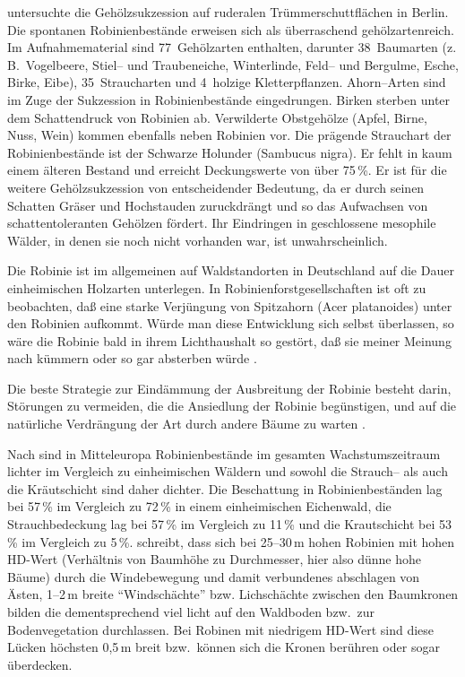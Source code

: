 \documentclass[twocolumn]{scrartcl}
\begin{document}
\citet{kowarik1990robinie} untersuchte die Gehölzsukzession auf
ruderalen Trümmerschuttflächen in Berlin. Die spontanen
Robinienbestände erweisen sich als überraschend gehölzartenreich. Im
Aufnahmematerial sind 77~Gehölzarten enthalten, darunter 38~Baumarten
(z.\,B.\ Vogelbeere, Stiel-- und Traubeneiche, Winterlinde, Feld-- und
Bergulme, Esche, Birke, Eibe), 35~Straucharten und 4~holzige
Kletterpflanzen. Ahorn--Arten sind im Zuge der Sukzession in
Robinienbestände eingedrungen. Birken sterben unter dem Schattendruck
von Robinien ab. Verwilderte Obstgehölze (Apfel, Birne, Nuss, Wein)
kommen ebenfalls neben Robinien vor. Die prägende Strauchart der
Robinienbestände ist der Schwarze Holunder (Sambucus nigra). Er fehlt
in kaum einem älteren Bestand und erreicht Deckungswerte von über
75\,\%. Er ist für die weitere Gehölzsukzession von entscheidender
Bedeutung, da er durch seinen Schatten Gräser und Hochstauden
zuruckdrängt und so das Aufwachsen von schattentoleranten Gehölzen
fördert. Ihr Eindringen in geschlossene mesophile Wälder, in denen sie
noch nicht vorhanden war, ist unwahrscheinlich.

Die Robinie ist im allgemeinen auf Waldstandorten in Deutschland auf
die Dauer einheimischen Holzarten unterlegen. In
Robinienforstgesellschaften ist oft zu beobachten, daß eine starke
Verjüngung von Spitzahorn (Acer platanoides) unter den Robinien
aufkommt. Würde man diese Entwicklung sich selbst überlassen, so wäre
die Robinie bald in ihrem Lichthaushalt so gestört, daß sie meiner
Meinung nach kümmern oder so gar absterben würde
\citep{kohler1963robinie}.

Die beste Strategie zur Eindämmung der Ausbreitung der Robinie besteht
darin, Störungen zu vermeiden, die die Ansiedlung der Robinie
begünstigen, und auf die natürliche Verdrängung der Art durch andere
Bäume zu warten \citep{motta2009robinieBekaempfung}.

Nach \citet{hanzelka2015robinie} sind in Mitteleuropa Robinienbestände
im gesamten Wachstumszeitraum lichter im Vergleich zu einheimischen
Wäldern und sowohl die Strauch-- als auch die Kräutschicht sind daher
dichter. Die Beschattung in Robinienbeständen lag bei 57\,\% im
Vergleich zu 72\,\% in einem einheimischen Eichenwald, die
Strauchbedeckung lag bei 57\,\% im Vergleich zu 11\,\% und die
Krautschicht bei 53\,\% im Vergleich zu 5\,\%.
\citet[S.~47]{bluemke1955robinie} schreibt, dass sich bei 25--30\,m
hohen Robinien mit hohen HD-Wert
(Verhältnis von Baumhöhe zu Durchmesser, hier also dünne hohe Bäume)
durch die Windebewegung und damit
verbundenes abschlagen von Ästen, 1--2\,m breite \enquote{Windschächte}
bzw. Lichschächte zwischen den Baumkronen bilden die dementsprechend
viel licht auf den Waldboden bzw.\ zur Bodenvegetation durchlassen.
Bei Robinen mit niedrigem HD-Wert sind diese Lücken höchsten 0,5\,m
breit bzw.\ können sich die Kronen berühren oder sogar überdecken.
\end{document}
